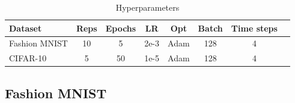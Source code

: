     \begin{table}
        \begin{tabularx}{\textwidth}{|X|c|c|c|c|c|c|c|}
            \toprule
            Dataset & Reps & Epochs & LR & Opt & Batch & Time steps \\
            \midrule
            Fashion MNIST & 10 & 5 & 2e-3 & Adam & 128 & 4 \\
            CIFAR-10 & 5 & 50 & 1e-5 & Adam & 128 & 4 \\
            \bottomrule
        \end{tabularx}
        \caption{Hyperparameters}
        \label{tab:hyperparameters_energy_tradeoff}
    \end{table}

    \subsection{Fashion MNIST}
    \label{appendix:energy_tradeoff_fashion_mnist}


